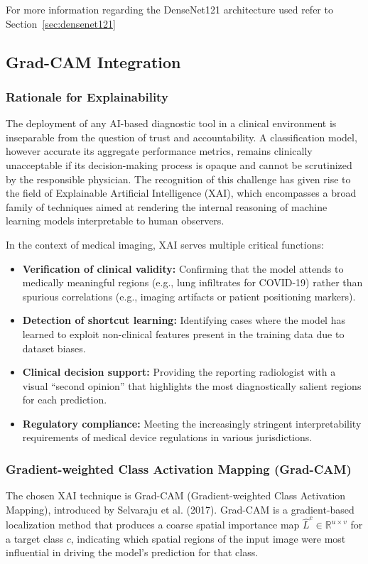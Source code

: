 For more information regarding the DenseNet121 architecture used refer to Section~\ref{sec:densenet121}
\newpage
\subsection{Grad-CAM Integration}
\label{sec:chest_xai}
\subsubsection{Rationale for Explainability}
The deployment of any AI-based diagnostic tool in a clinical environment is inseparable from the question of trust and accountability. A classification model, however accurate its aggregate performance metrics, remains clinically unacceptable if its decision-making process is opaque and cannot be scrutinized by the responsible physician. The recognition of this challenge has given rise to the field of Explainable Artificial Intelligence (XAI), which encompasses a broad family of techniques aimed at rendering the internal reasoning of machine learning models interpretable to human observers.

In the context of medical imaging, XAI serves multiple critical functions:

\begin{itemize}
	\item \textbf{Verification of clinical validity:} Confirming that the model attends to medically meaningful regions (e.g., lung infiltrates for COVID-19) rather than spurious correlations (e.g., imaging artifacts or patient positioning markers).
	
	\item \textbf{Detection of shortcut learning:} Identifying cases where the model has learned to exploit non-clinical features present in the training data due to dataset biases.
	
	\item \textbf{Clinical decision support:} Providing the reporting radiologist with a visual ``second opinion'' that highlights the most diagnostically salient regions for each prediction.
	
	\item \textbf{Regulatory compliance:} Meeting the increasingly stringent interpretability requirements of medical device regulations in various jurisdictions.
\end{itemize}

\subsubsection{Gradient-weighted Class Activation Mapping (Grad-CAM)}
The chosen XAI technique is Grad-CAM (Gradient-weighted Class Activation Mapping), introduced by Selvaraju et al. (2017). Grad-CAM is a gradient-based localization method that produces a coarse spatial importance map $\hat{L}^c \in \mathbb{R}^{u \times v}$ for a target class $c$, indicating which spatial regions of the input image were most influential in driving the model's prediction for that class.

